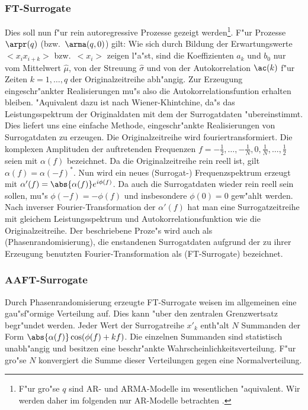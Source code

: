 \subsubsection{FT-Surrogate}
Dies soll nun f"ur rein autoregressive Prozesse gezeigt werden\footnote{F"ur gro"se $q$ sind AR- und
  ARMA-Modelle im wesentlichen "aquivalent. Wir werden daher im folgenden nur AR-Modelle
  betrachten \cite{Theiler92b}.}.
F"ur Prozesse $\arpr(q)$ (bzw.\ $\arma(q,0)$) gilt:
Wie sich durch Bildung der Erwartungswerte $<x_ix_{i+k}>$ bzw.\ $<x_i>$ zeigen l"a"st,
sind die Koeffizienten $a_k$ und $b_0$ nur vom Mittelwert $\hat\mu$, von der Streuung
$\hat\sigma$ und von der Autokorrelation $\ac(k)$ f"ur Zeiten $k=1,\dots,q$ der
Originalzeitreihe abh"angig. Zur Erzeugung eingeschr"ankter Realisierungen mu"s also die
Autokorrelationsfuntion erhalten bleiben. "Aquivalent dazu ist nach Wiener-Khintchine,
da"s das Leistungsspektrum der Originaldaten mit dem der Surrogatdaten "ubereinstimmt.
Dies liefert uns eine einfache Methode, eingeschr"ankte Realisierungen von Surrogatdaten
zu erzeugen. Die Originalzeitreihe wird fouriertransformiert.  Die komplexen Amplituden der
auftretenden Frequenzen $f=-\frac12, \dots, -\frac1N, 0, \frac1N, \dots, \frac12$ seien
mit $\alpha(f)$ bezeichnet. Da die Originalzeitreihe rein reell ist, gilt
$\alpha(f)=\alpha(-f)^*$. Nun wird ein neues (Surrogat-) Frequenzspektrum erzeugt mit
$\alpha'(f)=\abs{\alpha(f)}e^{i\phi(f)}$. Da auch die Surrogatdaten wieder rein reell sein
sollen, mu"s $\phi(-f)=-\phi(f)$ und insbesondere $\phi(0)=0$ gew"ahlt werden. Nach
inverser Fourier-Transformation der $\alpha'(f)$ hat man eine Surrogatzeitreihe mit
gleichem Leistungsspektrum und Autokorrelationsfunktion wie die Originalzeitreihe.  Der
beschriebene Proze"s wird auch als \begriff(Phasenrandomisierung), die enstandenen
Surrogatdaten aufgrund der zu ihrer Erzeugung benutzten Fourier-Transformation als
\begriff(FT-Surrogate) bezeichnet.


\subsubsection{AAFT-Surrogate}
Durch Phasenrandomisierung erzeugte FT-Surrogate weisen im allgemeinen eine gau"s\-f"ormige
Verteilung auf. Dies kann "uber den zentralen Grenzwertsatz begr"undet werden. Jeder Wert
der Surrogatreihe $x'_k$ enth"alt $N$ Summanden der Form
$\abs{\alpha(f)}\cos(\phi(f)+kf)$. Die einzelnen Summanden sind statistisch unabh"angig
und besitzen eine beschr"ankte Wahrscheinlichkeitsverteilung. F"ur gro"se $N$ konvergiert
die Summe dieser Verteilungen gegen eine Normalverteilung. 

